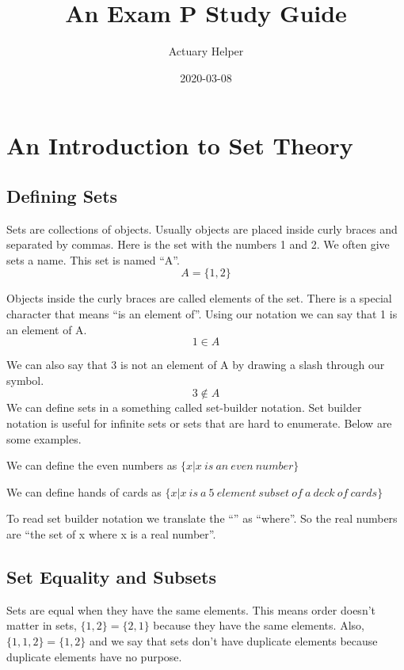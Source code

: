 \documentclass[
]{book}
\title{An Exam P Study Guide}
\author{Actuary Helper}
\date{2020-03-08}
\theoremstyle{definition}
\theoremstyle{definition}
\theoremstyle{definition}
\theoremstyle{remark}
\begin{document}
\maketitle

{
\setcounter{tocdepth}{1}
\tableofcontents
}
\hypertarget{an-introduction-to-set-theory}{%
\chapter{An Introduction to Set Theory}\label{an-introduction-to-set-theory}}

\hypertarget{defining-sets}{%
\section{Defining Sets}\label{defining-sets}}

Sets are collections of objects. Usually objects are placed inside curly braces and separated by commas. Here is the set with the numbers 1 and 2. We often give sets a name. This set is named ``A''. \[A=\{1,2\}\]

Objects inside the curly braces are called elements of the set. There is a special character that means ``is an element of''. Using our notation we can say that 1 is an element of A. \[1 \in A\]

We can also say that 3 is not an element of A by drawing a slash through our symbol.
\[3 \not\in A\]
We can define sets in a something called set-builder notation. Set builder notation is useful for infinite sets or sets that are hard to enumerate. Below are some examples.

We can define the even numbers as \(\{x | x \ is \  an \  even \ number\}\)

We can define hands of cards as \(\{x | x \ is \  a \ 5 \ element \ subset \ of \ a \ deck \ of \ cards\}\)

To read set builder notation we translate the ``\textbar{}'' as ``where''. So the real numbers are ``the set of x where x is a real number''.

\hypertarget{set-equality-and-subsets}{%
\section{Set Equality and Subsets}\label{set-equality-and-subsets}}

Sets are equal when they have the same elements. This means order doesn't matter in sets, \(\{1,2\} = \{2,1\}\) because they have the same elements. Also, \(\{1,1,2\} = \{1,2\}\) and we say that sets don't have duplicate elements because duplicate elements have no purpose.
\end{document}
